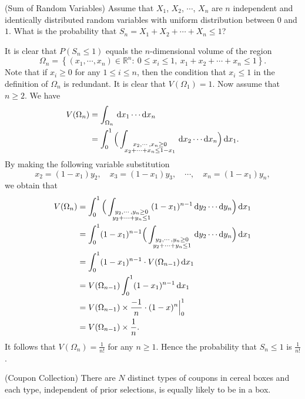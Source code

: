 \documentclass[12pt,letterpaper, onecolumn]{exam}
\begin{document}
\begin{questions}
        \question[](Sum of Random Variables) Assume that $X_1$, $X_2$, $\cdots$, $X_n$ are $n$ independent and identically distributed random variables with uniform distribution between $0$ and $1$. What is the probability that $S_n=X_1+X_2+\cdots+X_n\le 1$?
        \begin{solution}
            It is clear that $P(S_n\le 1)$ equals the $n$-dimensional volume of the region 
            $$\Omega_n=\left\{(x_1,\cdots,x_n)\in\mathbb{R}^n:\ 0\le x_i\le 1,\ x_1+x_2+\cdots+x_n\le 1\right\}.$$
            Note that if $x_i\ge 0$ for any $1\le i\le n$, then the condition that $x_i\le 1$ in the definition of $\Omega_n$ is redundant. It is clear that $V(\Omega_1)=1$. Now assume that $n\ge 2$. We have 
            \begin{align*}
                V(\Omega_n)&=\int_{\Omega_n}\,{\rm{d}}x_1\cdots{\rm{d}}x_n\\
                &=\int_0^1\Big(\int_{\substack{x_2,\cdots,x_n\ge 0\\x_2+\cdots+x_n\le 1-x_1}}\,{\rm{d}}x_2\cdots{\rm{d}}x_n\Big)\,{\rm{d}}x_1.
            \end{align*}
            By making the following variable substitution
            $$x_2=(1-x_1)y_2,\quad x_3=(1-x_1)y_3,\quad\cdots,\quad x_n=(1-x_1)y_n,$$
            we obtain that
            \begin{align*}
                V(\Omega_n)&=\int_0^1\Big(\int_{\substack{y_2,\cdots,y_n\ge 0\\y_2+\cdots+y_n\le 1}}(1-x_1)^{n-1}\,{\rm{d}}y_2\cdots{\rm{d}}y_n\Big)\,{\rm{d}}x_1\\
                &=\int_0^1(1-x_1)^{n-1}\Big(\int_{\substack{y_2,\cdots,y_n\ge 0\\y_2+\cdots+y_n\le 1}}\,{\rm{d}}y_2\cdots{\rm{d}}y_n\Big)\,{\rm{d}}x_1\\
                &=\int_0^1(1-x_1)^{n-1}\cdot V(\Omega_{n-1})\,{\rm{d}}x_1\\
                &=V(\Omega_{n-1})\int_0^1(1-x_1)^{n-1}\,{\rm{d}}x_1\\
                &=V(\Omega_{n-1})\times\frac{-1}{n}\cdot(1-x)^{n}\Big|_{0}^1\\
                &=V(\Omega_{n-1})\times\frac{1}{n}.
            \end{align*}
            It follows that $V(\Omega_n)=\frac{1}{n!}$ for any $n\ge 1$. Hence the probability that $S_n\le 1$ is $\frac{1}{n!}$.
        \end{solution}
        \question[](Coupon Collection) There are $N$ distinct types of coupons in cereal boxes and each type, independent of prior selections, is equally likely to be in a box.
        \begin{parts}

\end{parts}
\end{questions}
\end{document}

